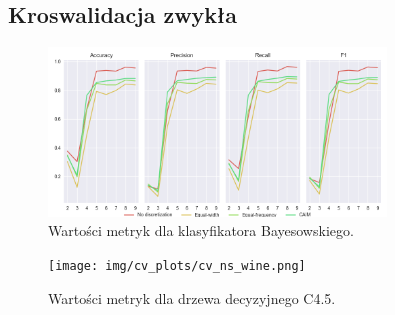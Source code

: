 \subsection*{Kroswalidacja zwykła}

\begin{figure}[H]
\center
    \includegraphics[width=0.8\textwidth]{img/cv_scores_kfold/scoring_kfold_wine.png}
    \caption{Wartości metryk dla klasyfikatora Bayesowskiego.}
\end{figure}

\begin{figure}[H]
    \center
    \texttt{[image: img/cv\_plots/cv\_ns\_wine.png]}
    \caption{Wartości metryk dla drzewa decyzyjnego C4.5.}
\end{figure}

